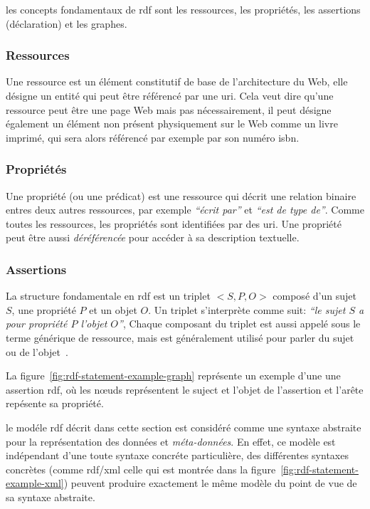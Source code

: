 les concepts fondamentaux de \acrshort{rdf} sont les ressources, les
propriétés, les assertions (déclaration) et les graphes.

\subsubsection{Ressources}
\label{sec:semantic-web-rdf-rdf-resources}

Une ressource est un élément constitutif de base de l'architecture du
Web, elle désigne un entité qui peut être référencé par une
\acrshort{uri}. Cela veut dire qu'une ressource peut être une page Web
mais pas nécessairement, il peut désigne également un élément non
présent physiquement sur le Web comme un livre imprimé, qui sera alors
référencé par exemple par son numéro \acrshort{isbn}.

\subsubsection{Propriétés}
\label{sec:semantic-web-rdf-rdf-properties}

Une propriété (ou une prédicat) est une ressource qui décrit une
relation binaire entres deux autres ressources, par exemple
\emph{``écrit par''} et \emph{``est de type de''}. Comme toutes les
ressources, les propriétés sont identifiées par des
\acrshort{uri}. Une propriété peut être aussi \emph{déréférencée} pour
accéder à sa description textuelle.

\subsubsection{Assertions}
\label{sec:semantic-web-rdf-rdf-statements}

La structure fondamentale en \acrshort{rdf} est un triplet $<S,P,O>$
composé d'un sujet $S$, une propriété $P$ et un objet $O$. Un triplet
s'interprète comme suit: \emph{``le sujet $S$ a pour propriété $P$
  l'objet $O$''}, Chaque composant du triplet est aussi appelé sous le
terme générique de ressource, mais est généralement utilisé pour
parler du sujet ou de l'objet~\cite{antoniou2012semantic}.\medskip



La figure~\ref{fig:rdf-statement-example-graph} représente un exemple
d'une une assertion \acrshort{rdf}, où les nœuds représentent le
suject et l'objet de l'assertion et l'arête repésente sa
propriété.\medskip

le modéle \acrshort{rdf} décrit dans cette section est considéré comme
une syntaxe abstraite pour la représentation des données et
\emph{méta-données}. En effet, ce modèle est indépendant d'une toute
syntaxe concréte particulière, des différentes syntaxes concrètes
(comme \acrshort{rdf/xml} celle qui est montrée dans la
figure~\ref{fig:rdf-statement-example-xml}) peuvent produire
exactement le même modèle du point de vue de sa syntaxe
abstraite.\medskip


